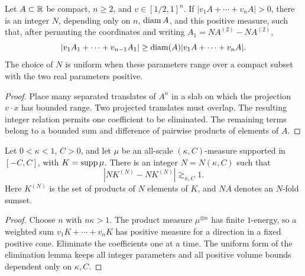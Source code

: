 \begin{lemma}
\label{lem:expansion-step}
Let $A\subset\mathbb{R}$ be compact, $n\geq2$, and
$v\in[1/2,1]^n$. If $|v_1A+\cdots+v_nA|>0$, there is an integer
$N$, depending only on $n$, $\operatorname{diam} A$, and this positive measure,
such that, after permuting the coordinates and writing
$A_1=NA^{(2)}-NA^{(2)}$,
\[
       |v_1A_1+\cdots+v_{n-1}A_1|
                    \geq\operatorname{diam}(A)|v_1A+\cdots+v_nA|.
\]
The choice of $N$ is uniform when these parameters range over a
compact subset with the two real parameters positive.
\end{lemma}
\begin{proof}
Place many separated translates of $A^n$ in a slab on which the
projection $v\cdot x$ has bounded range. Two projected translates
must overlap. The resulting integer relation permits one coefficient
to be eliminated. The remaining terms belong to a bounded sum and
difference of pairwise products of elements of $A$.
\end{proof}

\begin{theorem}
\label{thm:expansion}
Let $0<\kappa<1$, $C>0$, and let $\mu$ be an all-scale
$(\kappa,C)$-measure supported in $[-C,C]$, with $K=\operatorname{supp}\mu$.
There is an integer $N=N(\kappa,C)$ such that
\[
                         |NK^{(N)}-NK^{(N)}|\gtrsim_{\kappa,C}1.
\]
Here $K^{(N)}$ is the set of products of $N$ elements of $K$,
and $NA$ denotes an $N$-fold sumset.
\end{theorem}
\begin{proof}
Choose $n$ with $n\kappa>1$. The product measure $\mu^{\otimes n}$
has finite $1$-energy, so a weighted sum $v_1K+\cdots+v_nK$ has
positive measure for a direction in a fixed positive cone. Eliminate
the coefficients one at a time. The uniform form of the elimination
lemma keeps all integer parameters and all positive volume bounds
dependent only on $\kappa,C$.
\end{proof}

